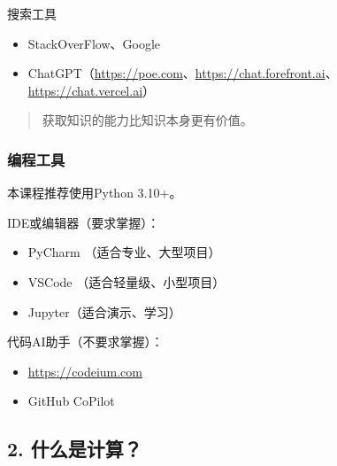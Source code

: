 \documentclass[aspectratio=169, 14pt]{beamer}
\begin{document}
\begin{frame}{搜索工具}

	\begin{itemize}
		\item StackOverFlow、Google
		\item ChatGPT（\url{https://poe.com}、\url{https://chat.forefront.ai}、\url{https://chat.vercel.ai}）
	\end{itemize}

	\begin{quote}
		获取知识的能力比知识本身更有价值。
	\end{quote}

\end{frame}
\begin{frame}
	\frametitle{编程工具}
	本课程推荐使用\alert{Python 3.10+}。

	IDE或编辑器（要求掌握）：
	\begin{itemize}
		\item PyCharm （适合专业、大型项目）
		\item VSCode （适合轻量级、小型项目）
		\item Jupyter（适合演示、学习）
	\end{itemize}

	代码AI助手（不要求掌握）：
	\begin{itemize}
		\item \url{https://codeium.com}
		\item GitHub CoPilot
	\end{itemize}
\end{frame}

{
\begin{frame}
	\section{\textcolor{darkmidnightblue}{2. 什么是计算？}}
\end{frame}
}
\end{document}
